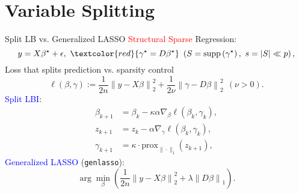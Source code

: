 \documentclass[slidestop,compress,9pt,epsfig,color]{beamer}
\theoremstyle{example}
\begin{document}
\section{Variable Splitting}
\begin{frame}{Split LB vs. Generalized LASSO}
\textcolor{red}{Structural Sparse} Regression:
\begin{equation}
    \label{eq:model}
    y = X\beta^\star + \epsilon,\ \textcolor{red}{\gamma^\star = D\beta^\star} \ \left( S = \mathrm{supp}\left( \gamma^\star \right),\ s = |S|\ll p \right),
\end{equation}
Loss that splits prediction vs. sparsity control
\begin{equation}
    \label{eq:l-def}
    \ell\left( \beta, \gamma \right) := \frac{1}{2n} \left\| y - X \beta \right\|_2^2  + \frac{1}{2\nu} \left\| \gamma - D \beta \right\|_2^2\ \ (\nu > 0).
\end{equation}
\textcolor{blue}{Split LBI}:
\begin{subequations}
    \label{eq:slbi-show}
    \begin{align}
        \label{eq:slbi-show-a}
        \beta_{k+1} &= \beta_k - \kappa \alpha \nabla_{\beta} \ell(\beta_k,\gamma_k),\\
        \label{eq:slbi-show-b}
        z_{k+1} &= z_k - \alpha \nabla_\gamma \ell(\beta_k,\gamma_k),\\
        \label{eq:slbi-show-c}
        \gamma_{k+1} &= \kappa \cdot \mathrm{prox}_{\|\cdot\|_1} (z_{k+1}), 
    \end{align}
\end{subequations}
\textcolor{blue}{Generalized LASSO} ({\texttt{genlasso}}):
\begin{equation}
    \label{eq:genlasso}
    \arg\min_{\beta} \left( \frac{1}{2n} \left\| y - X\beta \right\|_2^2 + \lambda \left\| D \beta \right\|_1 \right).
\end{equation}
\end{frame}
\end{document}

